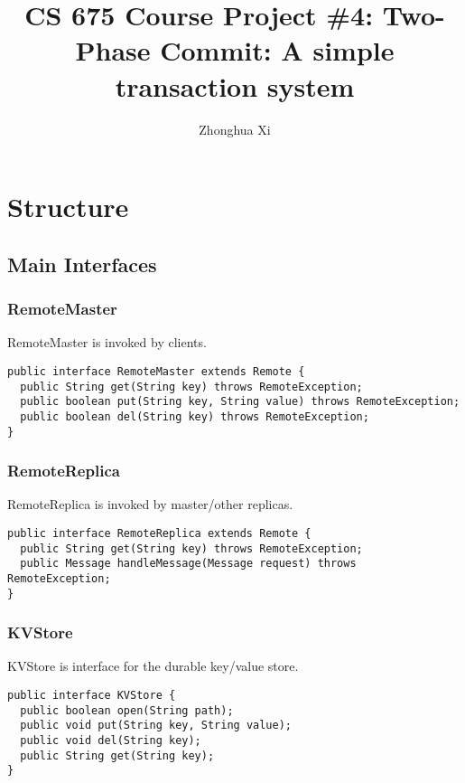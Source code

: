 \documentclass[11pt, oneside]{article}   	%
\title{CS 675 Course Project \#4: Two-Phase Commit: A simple transaction system}
\author{Zhonghua Xi}
\begin{document}
\maketitle

\section{Structure}
\subsection{Main Interfaces}
\subsubsection{RemoteMaster}
RemoteMaster is invoked by clients.

\begin{verbatim}
public interface RemoteMaster extends Remote {
  public String get(String key) throws RemoteException;
  public boolean put(String key, String value) throws RemoteException;
  public boolean del(String key) throws RemoteException;
}
\end{verbatim}

\subsubsection{RemoteReplica}
RemoteReplica is invoked by master/other replicas.
\begin{verbatim}
public interface RemoteReplica extends Remote {
  public String get(String key) throws RemoteException;
  public Message handleMessage(Message request) throws RemoteException;
}
\end{verbatim}

\subsubsection{KVStore}
KVStore is interface for the durable key/value store.
\begin{verbatim}
public interface KVStore {  
  public boolean open(String path);
  public void put(String key, String value);
  public void del(String key);
  public String get(String key);
}
\end{verbatim}
\end{document}
